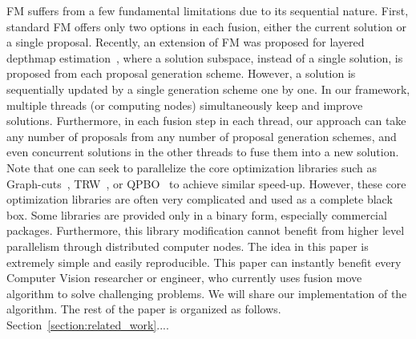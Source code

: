 FM suffers from a few fundamental limitations due to its sequential
nature. First, standard FM offers only two options in each fusion,
either the current solution or a single proposal. Recently, an extension
of FM was proposed for layered depthmap estimation~\cite{chen_2016},
where a solution subspace, instead of a single solution, is proposed
from each proposal generation scheme. However, a solution is
sequentially updated by a single generation scheme one by one. In our
framework, multiple threads (or computing nodes) simultaneously keep and
improve solutions. Furthermore, in each fusion step in each thread, our
approach can take any number of proposals from any number of proposal
generation schemes, and even concurrent solutions in the other threads
to fuse them into a new solution.
%
Note that one can seek to parallelize the core optimization libraries
such as Graph-cuts~\cite{}, TRW~\cite{kolmogorov}, or QPBO~\cite{} to
achieve similar speed-up. However, these core optimization libraries are
often very complicated and used as a complete black box. Some libraries
are provided only in a binary form, especially commercial
packages. Furthermore, this library modification cannot benefit from
higher level parallelism through distributed computer nodes.
%
The idea in this paper is extremely simple and easily reproducible. This
paper can instantly benefit every Computer Vision researcher or
engineer, who currently uses fusion move algorithm to solve challenging
problems. We will share our implementation of the algorithm. The rest of
the paper is organized as follows. Section~\ref{section:related_work}....
%

